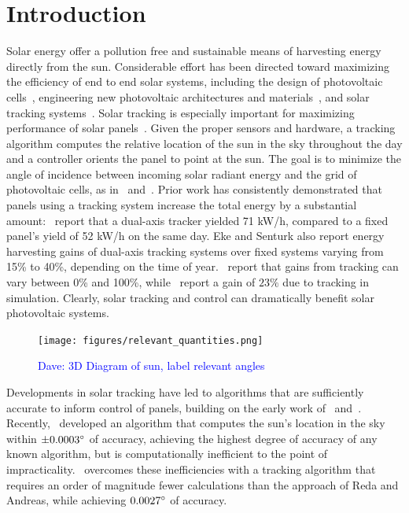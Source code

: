 \documentclass{article}
\newcommand{\dnote}[1]{\textcolor{blue}{Dave: #1}}
\begin{document}
\section{Introduction}
Solar energy offer a pollution free and sustainable means of harvesting energy directly from the sun. Considerable effort has been directed toward maximizing the efficiency of end to end solar systems, including the design of photovoltaic cells~\cite{Jervase2001,li2012molecular}, engineering new photovoltaic architectures and materials~\cite{li2005high}, and solar tracking systems~\cite{camacho2012control}. Solar tracking is especially important for maximizing performance of solar panels~\cite{Eke2012,Rizk2008,King2001}. Given the proper sensors and hardware, a tracking algorithm computes the relative location of the sun in the sky throughout the day and a controller orients the panel to point at the sun. The goal is to minimize the angle of incidence between incoming solar radiant energy and the grid of photovoltaic cells, as in~\citet{Eke2012,Benghanem2011,King2001} and~\citet{kalogirou1996design}. Prior work has consistently demonstrated that panels using a tracking system increase the total energy by a substantial amount:~\citet{Eke2012} report that a dual-axis tracker yielded 71 kW/h, compared to a fixed panel's yield of 52 kW/h on the same day. Eke and Senturk also report energy harvesting gains of dual-axis tracking systems over fixed systems varying from 15\% to 40\%, depending on the time of year.~\citet{mousazadeh2009review} report that gains from tracking can vary between 0\% and 100\%, while~\citet{clifford2004design} report a gain of $23\%$ due to tracking in simulation. Clearly, solar tracking and control can dramatically benefit solar photovoltaic systems.

\begin{figure}[t]
\begin{center}
\texttt{[image: figures/relevant\_quantities.png]}
\caption{\dnote{3D Diagram of sun, label relevant angles}}
\end{center}
\end{figure}

Developments in solar tracking have led to algorithms that are sufficiently accurate to inform control of panels, building on the early work of~\citet{spencer1971fourier,walraven1978calculating} and~\citet{michalsky1988astronomical}. Recently,~\citet{reda2004solar} developed an algorithm that computes the sun's location in the sky within $\pm 0.0003\degree$ of accuracy, achieving the highest degree of accuracy of any known algorithm, but is computationally inefficient to the point of impracticality.~\citet{Grena2008} overcomes these inefficiencies with a tracking algorithm that requires an order of magnitude fewer calculations than the approach of Reda and Andreas, while achieving $0.0027\degree$ of accuracy.
\end{document}
